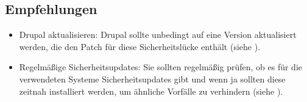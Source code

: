 \subsection*{Empfehlungen}
\begin{itemize}
    \item Drupal aktualisieren: Drupal sollte unbedingt auf eine Version aktualisiert werden, die den Patch für diese Sicherheitslücke enthält (siehe \cite{owaspVulnerableDependency}).
    \item Regelmäßige Sicherheitsupdates: Sie sollten regelmäßig prüfen, ob es für die verwendeten Systeme Sicherheitsupdates gibt und wenn ja sollten diese zeitnah installiert werden, um ähnliche Vorfälle zu verhindern (siehe \cite{owaspVulnerableDependency}).
\end{itemize}